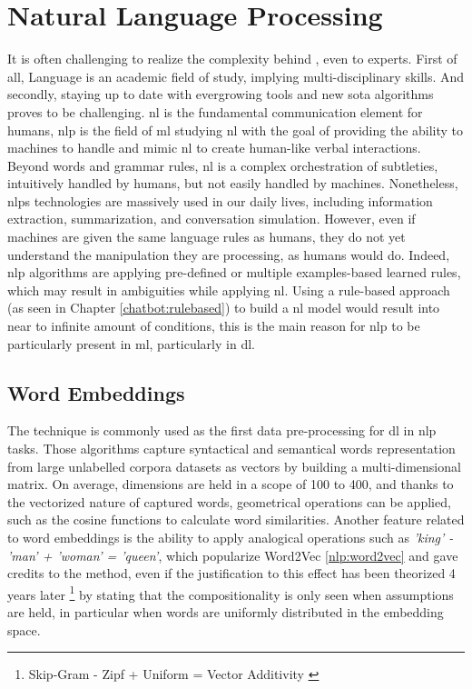 \chapter{Natural Language Processing}
\label{chap:nlp}

It is often challenging to realize the complexity behind , even to experts. First of all, Language is an academic field of study, implying multi-disciplinary skills. And secondly, staying up to date with evergrowing tools and new \gls{sota} algorithms proves to be challenging. \gls{nl} is the fundamental communication element for humans, \gls{nlp} is the field of \gls{ml} studying \gls{nl} with the goal of providing the ability to machines to handle and mimic \gls{nl} to create human-like verbal interactions. Beyond words and grammar rules, \gls{nl} is a complex orchestration of subtleties, intuitively handled by humans, but not easily handled by machines. Nonetheless, \glspl{nlp} technologies are massively used in our daily lives, including information extraction, summarization, and conversation simulation. However, even if machines are given the same language rules as humans, they do not yet understand the manipulation they are processing, as humans would do. Indeed, \gls{nlp} algorithms are applying pre-defined or multiple examples-based learned rules, which may result in ambiguities while applying \gls{nl}. Using a rule-based approach (as seen in Chapter \ref{chatbot:rulebased}) to build a \gls{nl} model would result into near to infinite amount of conditions, this is the main reason for \gls{nlp} to be particularly present in \gls{ml}, particularly in \gls{dl}. 


\section{Word Embeddings}
\label{nlp:we}
The technique is commonly used as the first data pre-processing for \gls{dl} in \gls{nlp} tasks. Those  algorithms capture syntactical and semantical words representation from large unlabelled corpora datasets as vectors by building a multi-dimensional matrix. On average, dimensions are held in a scope of 100 to 400, and thanks to the vectorized nature of captured words, geometrical operations can be applied, such as the cosine functions to calculate word similarities. Another feature related to word embeddings is the ability to apply analogical operations such as \textit{'king' - 'man' + 'woman' = 'queen'}, which popularize Word2Vec \ref{nlp:word2vec} and gave credits to the method, even if the justification to this effect has been theorized 4 years later \footnote{Skip-Gram - Zipf + Uniform = Vector Additivity \autocite{paper:gittens-etal-2017-skip}} by stating that the compositionality is only seen when assumptions are held, in particular when words are uniformly distributed in the embedding space.


